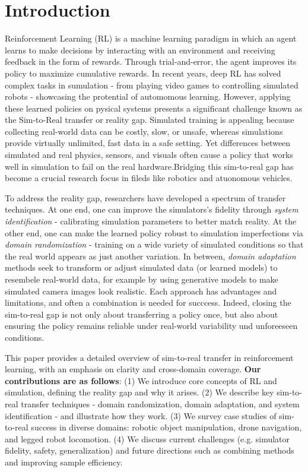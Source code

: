 \section{Introduction}

Reinforcement Learning (RL) is a machine learning paradigm in which an agent learns to make decisions by interacting with an environment and receiving feedback in the form of rewards. Through trial-and-error, the agent improves its policy to maximize cumulative rewards. In recent years, deep RL has solved complex tasks in sumulation - from playing video games to controlling simulated robots - showcasing the protential of automomous learning. However, applying these learned policies on pysical systems presents a significant challenge known as the Sim-to-Real transfer or reality gap. Simulated training is appealing because collecting real-world data can be costly, slow, or unsafe, whereas simulations provide virtually unlimited, fast data in a safe setting. Yet differences between simulated and real physics, sensors, and visuals often cause a policy that works well in simulation to fail on the real hardware.Bridging this sim-to-real gap has become a crucial research focus in fileds like robotics and atuonomous vehicles.

To address the reality gap, researchers have developed a spectrum of transfer techniques. At one end, one can improve the simulators's fidelity through \textit{system identification} - calibrating simulation parameters to better match reality. At the other end, one can make the learned policy robust to simulation imperfections via \textit{domain randomization} - training on a wide variety of simulated conditions so that the real world appears as just another variation. In between, \textit{domain adaptation} methods seek to transform or adjust simulated data (or learned models) to resembele real-world data, for example by using generative models to make simulated camera images look realistic. Each approach has advantages and limitations, and often a combination is needed for succcess. Indeed, closing the sim-to-real gap is not only about transferring a policy once, but also about ensuring the policy remains reliable under real-world variability und unforeeseen conditions. 

This paper provides a detailed overview of sim-to-real transfer in reinforcement learning, with an emphasis on clarity and cross-domain coverage. \textbf{Our contributions are as follows}: (1) We introduce core concepts of RL and simulation, defining the reality gap and why it arises. (2) We describe key sim-to-real transfer techniques - domain randomization, domain adaptation, and system identification - and illustrate how they work. (3) We survey case studies  of sim-to-real success in diverse  domains: robotic object manipulation, drone navigation, and legged robot locomotion. (4) We discuss current challenges (e.g. simulator fidelity, safety, generalization) and future directions such as combining methods and improving sample efficiency. 


